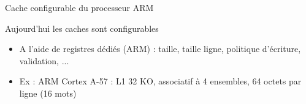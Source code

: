 %


\begin{Frame}{Cache configurable du processeur ARM}


      \begin{block}{Aujourd'hui les caches sont configurables}
       \begin{center}
     \begin{itemize}
     \item A l'aide de registres dédiés (ARM) : taille, taille ligne,
       politique d'écriture, validation, ...
     \item Ex : ARM Cortex A-57 : L1 32 KO, associatif à 4 ensembles,
       64 octets par ligne (16 mots)
        \end{itemize}
       \end{center}
      \end{block}   

\vspace{-0,8cm}
        \begin{center}
        \end{center}


\end{Frame}


